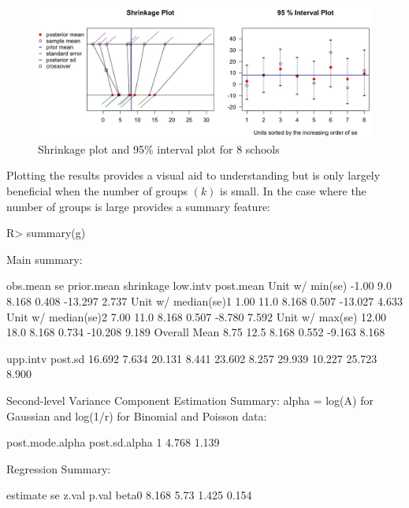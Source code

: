 \documentclass[article]{jss}
\begin{document}
\begin{figure}[h] 
\begin{center}
\includegraphics[scale=0.3]{school1.png}
\caption{Shrinkage plot and 95\% interval plot for 8 schools}
\label{fig:8schoolsplot}
\end{center}
\end{figure}

Plotting the results provides a visual aid to understanding but is only largely beneficial when the number of groups $(k)$ is small. In the case where the number of groups is large  provides a summary feature:

\begin{CodeChunk}
\begin{CodeInput}
R> summary(g)
\end{CodeInput}
\begin{CodeOutput}
Main summary:

                    obs.mean   se prior.mean shrinkage low.intv post.mean
Unit w/ min(se)        -1.00  9.0      8.168     0.408  -13.297     2.737
Unit w/ median(se)1     1.00 11.0      8.168     0.507  -13.027     4.633
Unit w/ median(se)2     7.00 11.0      8.168     0.507   -8.780     7.592
Unit w/ max(se)        12.00 18.0      8.168     0.734  -10.208     9.189
Overall Mean            8.75 12.5      8.168     0.552   -9.163     8.168

                     upp.intv post.sd
                       16.692   7.634
                       20.131   8.441
                       23.602   8.257
                       29.939  10.227
                       25.723   8.900

Second-level Variance Component Estimation Summary:
alpha = log(A) for Gaussian and log(1/r) for Binomial and Poisson data:

  post.mode.alpha post.sd.alpha
1           4.768         1.139


Regression Summary:

      estimate   se z.val p.val
beta0    8.168 5.73 1.425 0.154
\end{CodeOutput}
\end{CodeChunk}
\end{document}
